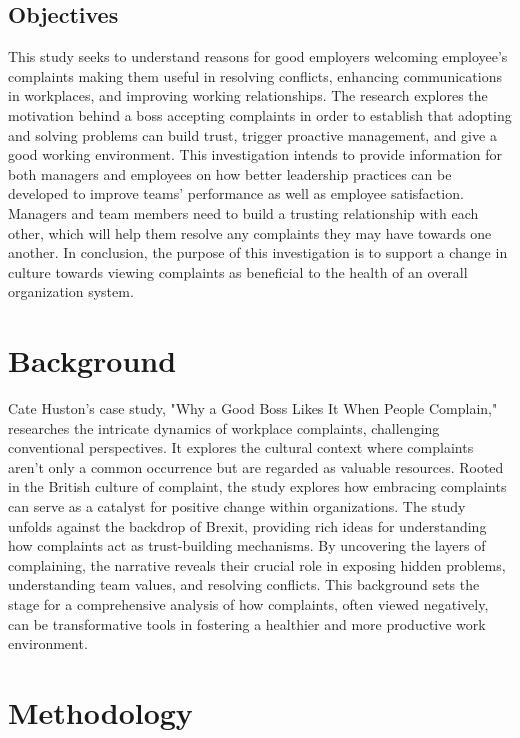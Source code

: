 \documentclass[a4paper,12pt]{report}
\begin{document}
\section{Objectives}
\begin{enumerate}
This study seeks to understand reasons for good employers welcoming employee’s complaints making them useful in resolving conflicts, enhancing communications in workplaces, and improving working relationships. The research explores the motivation behind a boss accepting complaints in order to establish that adopting and solving problems can build trust, trigger proactive management, and give a good working environment. This investigation intends to provide information for both managers and employees on how better leadership practices can be developed to improve teams’ performance as well as employee satisfaction. Managers and team members need to build a trusting relationship with each other, which will help them resolve any complaints they may have towards one another. In conclusion, the purpose of this investigation is to support a change in culture towards viewing complaints as beneficial to the health of an overall organization system.
\end{enumerate}


\chapter{Background}

    Cate Huston's case study, "Why a Good Boss Likes It When People Complain," researches the intricate dynamics of workplace complaints, challenging conventional perspectives. It explores the cultural context where complaints aren't only a common occurrence but are regarded as valuable resources.  Rooted in the British culture of complaint, the study explores how embracing complaints can serve as a catalyst for positive change within organizations. The study unfolds against the backdrop of Brexit, providing rich ideas for understanding how complaints act as trust-building mechanisms. By uncovering the layers of complaining,  the narrative reveals their crucial role in exposing hidden problems, understanding team values, and resolving conflicts. This background sets the stage for a comprehensive analysis of how complaints, often viewed negatively, can be transformative tools in fostering a healthier and more productive work environment.

\chapter{Methodology}
\end{document}
